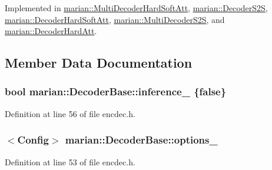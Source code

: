 Implemented in \hyperlink{classmarian_1_1MultiDecoderHardSoftAtt_a9dc01206082f6b287300c2ee6460d3ba}{marian\+::\+Multi\+Decoder\+Hard\+Soft\+Att}, \hyperlink{classmarian_1_1DecoderS2S_a786a6f2e325d86a8335cc5fc25170518}{marian\+::\+Decoder\+S2S}, \hyperlink{classmarian_1_1DecoderHardSoftAtt_aa3331fae45271298ce86ad6f6a5c9cf5}{marian\+::\+Decoder\+Hard\+Soft\+Att}, \hyperlink{classmarian_1_1MultiDecoderS2S_a6f0421ce42840c6198f3d450b3d55bfb}{marian\+::\+Multi\+Decoder\+S2S}, and \hyperlink{classmarian_1_1DecoderHardAtt_ab938d5649fc73437fa39a462330245bf}{marian\+::\+Decoder\+Hard\+Att}.



\subsection{Member Data Documentation}
\subsubsection[{\texorpdfstring{inference\+\_\+}{inference_}}]{\setlength{\rightskip}{0pt plus 5cm}bool marian\+::\+Decoder\+Base\+::inference\+\_\+ \{false\}\hspace{0.3cm}{\ttfamily [protected]}}\hypertarget{classmarian_1_1DecoderBase_a808975d515f60a53096f6794c3dc61d4}{}\label{classmarian_1_1DecoderBase_a808975d515f60a53096f6794c3dc61d4}


Definition at line 56 of file encdec.\+h.

\subsubsection[{\texorpdfstring{options\+\_\+}{options_}}]{$<${\bf Config}$>$ marian\+::\+Decoder\+Base\+::options\+\_\+\hspace{0.3cm}{\ttfamily [protected]}}\hypertarget{classmarian_1_1DecoderBase_a75375e7661a014fd15bbee3b0a047b91}{}\label{classmarian_1_1DecoderBase_a75375e7661a014fd15bbee3b0a047b91}


Definition at line 53 of file encdec.\+h.

